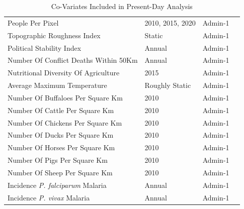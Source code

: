 \documentclass{article}
\begin{document}
\begin{table}[H]
\begin{tabular}{llll}
		People Per Pixel & 2010, 2015, 2020 & Admin-1 & \cite{Doxsey-Whitfield2015} \\
		Topographic Roughness Index & Static & Admin-1 & \cite{USGS1996, Riley1999} \\
		Political Stability Index & Annual & Admin-1 & \cite{Kaufmann2011} \\
		Number Of Conflict Deaths Within 50Km & Annual & Admin-1 & \cite{Eriksson2015} \\
		Nutritional Diversity Of Agriculture & 2015 & Admin-1 & \cite{Herrero2017a} \\
		Average Maximum Temperature & Roughly Static & Admin-1 & \cite{Sheffield2006} \\
		Number Of Buffaloes Per Square Km & 2010 & Admin-1 & \cite{Robinson2014} \\
		Number Of Cattle Per Square Km & 2010 & Admin-1 & \cite{Robinson2014} \\
		Number Of Chickens Per Square Km & 2010 & Admin-1 & \cite{Robinson2014} \\
		Number Of Ducks Per Square Km & 2010 & Admin-1 & \cite{Robinson2014} \\
		Number Of Horses Per Square Km & 2010 & Admin-1 & \cite{Robinson2014} \\
		Number Of Pigs Per Square Km & 2010 & Admin-1 & \cite{Robinson2014} \\
		Number Of Sheep Per Square Km & 2010 & Admin-1 & \cite{Robinson2014} \\
		Incidence \textit{P. falciparum} Malaria & Annual & Admin-1 & \cite{Weiss2019} \\
		Incidence \textit{P. vivax} Malaria & Annual & Admin-1 & \cite{Weiss2019} \\
		\bottomrule
	\end{tabular}
	\caption{Co-Variates Included in Present-Day Analysis}
	\label{tab:covars1}
\end{table}
\end{document}
